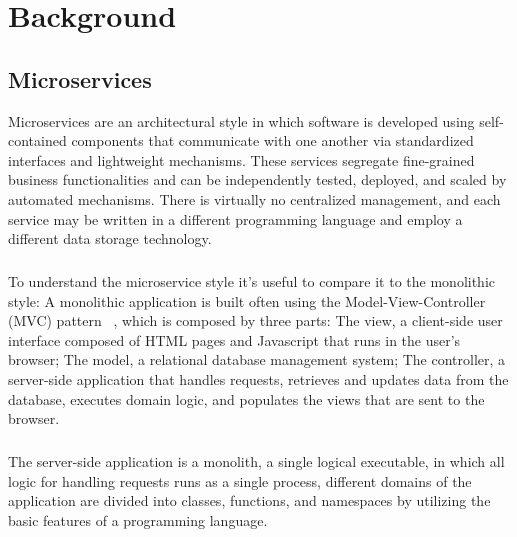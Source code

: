 
%

\chapter{Background}
\label{cha:background}

\section{Microservices} %
\label{sec:microservices}

Microservices \cite{microservices, microservices2017tenets, microservicesTomorrow} are an architectural style in which software is developed using self-contained components that
communicate with one another via standardized interfaces and lightweight mechanisms.
These services segregate fine-grained business functionalities and can be independently tested, deployed, and scaled by automated mechanisms.
There is virtually no centralized management, and each service may be written in a different programming language and employ a different data storage technology.

\paragraph{}

To understand the microservice style it's useful to compare it to the monolithic style:
A monolithic application is built often using the Model-View-Controller (MVC) pattern ~\cite{mvc}, which is composed by three parts:
The view, a client-side user interface composed of HTML pages and Javascript that runs in the user's browser;
The model, a relational database management system;
The controller, a server-side application that handles requests, retrieves and updates data from the database, executes domain logic,
and populates the views that are sent to the browser.

\paragraph{}

The server-side application is a monolith, a single logical executable, in which all logic for handling requests runs as a single process,
different domains of the application are divided into classes, functions, and namespaces by utilizing the basic features of a programming language.

